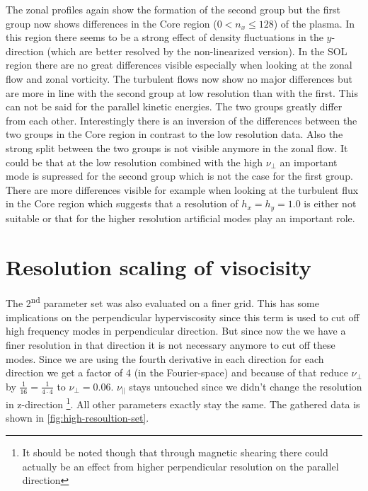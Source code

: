 \documentclass[master.tex]{subfiles}
\begin{document}
The zonal profiles again show the formation of the second group but the first group now shows differences in the Core region ($0 < n_x \leq 128$) of the plasma. In this region there seems to be a strong effect of density fluctuations in the $y$-direction (which are better resolved by the non-linearized version). In the \ac{SOL} region there are no great differences visible especially when looking at the zonal flow and zonal vorticity. The turbulent flows now show no major differences but are more in line with the second group at low resolution than with the first. This can not be said for the parallel kinetic energies. The two groups greatly differ from each other. Interestingly there is an inversion of the differences between the two groups in the Core region in contrast to the low resolution data. Also the strong split between the two groups is not visible anymore in the zonal flow. It could be that at the low resolution combined with the high $\nu_\perp$ an important mode is supressed for the second group which is not the case for the first group. There are more differences visible for example when looking at the turbulent flux in the Core region which suggests that a resolution of $h_x=h_y=1.0$ is either not suitable or that for the higher resolution artificial modes play an important role.

\section{Resolution scaling of visocisity}

The 2\textsuperscript{nd} parameter set was also evaluated on a finer grid. This has some implications on the perpendicular hyperviscosity since this term is used to cut off high frequency modes in perpendicular direction. But since now the we have a finer resolution in that direction it is not necessary anymore to cut off these modes. Since we are using the fourth derivative in each direction for each direction we get a factor of 4 (in the Fourier-space) and because of that reduce $\nu_\perp$ by $\frac{1}{16} = \frac{1}{4\cdot4}$ to $\nu_\perp = 0.06$. $\nu_\parallel$ stays untouched since we didn't change the resolution in z-direction \footnote{It should be noted though that through magnetic shearing there could actually be an effect from higher perpendicular resolution on the parallel direction}. All other parameters exactly stay the same. The gathered data is shown in \autoref{fig:high-resoultion-set}. 
\end{document}
